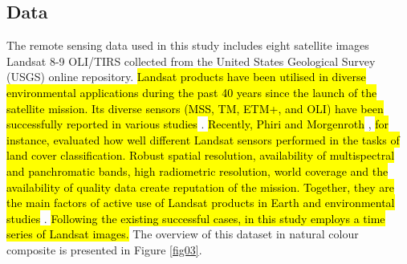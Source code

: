 \documentclass[jimaging,article,submit,pdftex,moreauthors]{Definitions/mdpi}
\begin{document}
\subsection{Data}
The remote sensing data used in this study includes eight satellite images Landsat 8-9 OLI/TIRS collected from the United States Geological Survey (USGS) online repository. \hl{Landsat products have been utilised in diverse environmental applications during the past 40 years since the launch of the satellite mission. Its diverse sensors (MSS, TM, ETM+, and OLI)  have been successfully reported in various studies} \cite{rs16122222,app142412020,land12111995,rs16193596}. \hl{Recently, Phiri and Morgenroth} \cite{rs9090967}, \hl{for instance, evaluated how well different Landsat sensors performed in the tasks of land cover classification. Robust spatial resolution, availability of multispectral and panchromatic bands, high radiometric resolution, world coverage and the availability of quality data  create reputation of the mission. Together, they are the main factors of active use of Landsat products in Earth and environmental studies} \cite{f15061055,rs17091510,analytics2030040,app15094653,rs17071163,asi6040061,su17083480}. \hl{Following the existing successful cases, in this study employs a time series of Landsat images. }The overview of this dataset in natural colour composite is presented in Figure \ref{fig03}.
\end{document}

